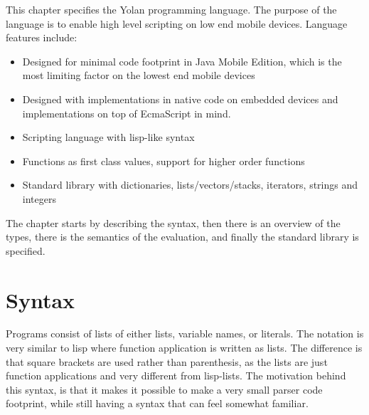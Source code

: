 This chapter specifies the Yolan programming language.
The purpose of the language is to enable high level scripting on low end mobile devices. Language features include:
\begin{itemize}
\item Designed for minimal code footprint in Java Mobile Edition, which is the most limiting factor on the lowest end mobile devices
\item Designed with implementations in native code on embedded devices and implementations on top of EcmaScript in mind.
\item Scripting language with lisp-like syntax
\item Functions as first class values, support for higher order functions
\item Standard library with dictionaries, lists/vectors/stacks, iterators, strings and integers
\end{itemize}

The chapter starts by describing the syntax, then there is an overview of the types, there is the semantics of the evaluation, and finally the standard library is specified.


\section{Syntax}
Programs consist of lists of either lists, variable names, or literals.
The notation is very similar to lisp where function application is written as lists.
The difference is that square brackets are used rather than parenthesis, 
as the lists are just function applications and very different from lisp-lists.
The motivation behind this syntax, is that it makes it possible to make a very small parser code footprint, while still having a syntax that can feel somewhat familiar.

